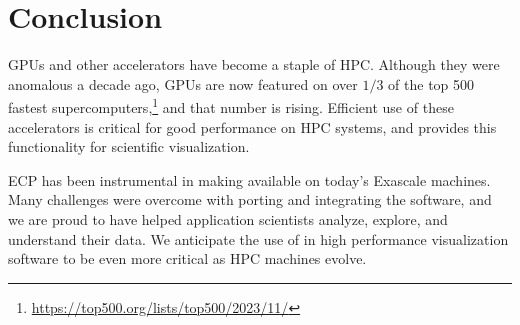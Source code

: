 \section{Conclusion}


GPUs and other accelerators have become a staple of HPC.
Although they were anomalous a decade ago, GPUs are now featured on over $1/3$ of the top 500 fastest supercomputers,\footnote{\url{https://top500.org/lists/top500/2023/11/}} and that number is rising.
Efficient use of these accelerators is critical for good performance on HPC systems, and \vtkm provides this functionality for scientific visualization.

ECP has been instrumental in making \vtkm available on today's Exascale machines.
Many challenges were overcome with porting and integrating the software, and we are proud to have helped application scientists analyze, explore, and understand their data.
We anticipate the use of \vtkm in high performance visualization software to be even more critical as HPC machines evolve.
